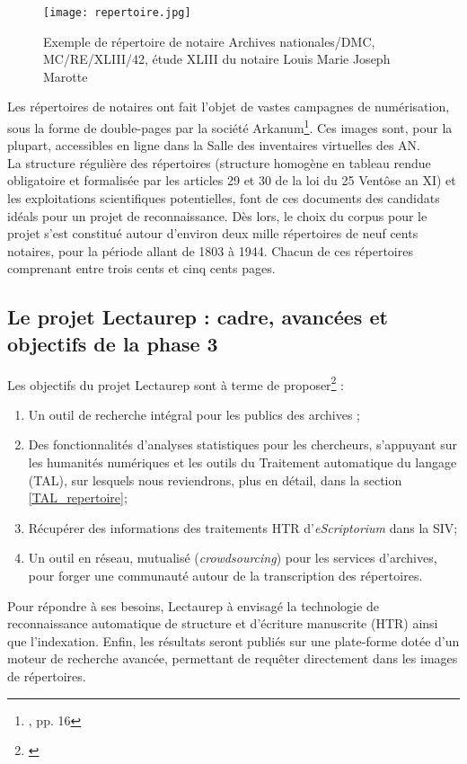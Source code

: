 \newpage
\begin{figure}[h!]
    \centering
    \texttt{[image: repertoire.jpg]}
    \caption{Exemple de répertoire de notaire  \textcopyright Archives nationales/DMC, MC/RE/XLIII/42, étude XLIII du notaire Louis Marie Joseph Marotte}
    \label{fig:repertoire}
\end{figure}
\newpage
Les répertoires de notaires ont fait l'objet de vastes campagnes de numérisation, sous la forme de double-pages par la société Arkanum\footnote{\cite{bonhomme_defis_2018}, pp. 16}. Ces images sont, pour la plupart, accessibles en ligne dans la Salle des inventaires virtuelles des AN. \\

La structure régulière des répertoires (structure homogène en tableau rendue obligatoire et formalisée par les articles 29 et 30 de la loi du 25 Ventôse an XI) et les exploitations scientifiques potentielles, font de ces documents des candidats idéals pour un projet de reconnaissance. Dès lors, le choix du corpus pour le projet s'est constitué autour d'environ deux mille répertoires de neuf cents notaires, pour la période allant de 1803 à 1944. Chacun de ces répertoires comprenant entre trois cents et cinq cents pages.

\subsection{Le projet Lectaurep : cadre, avancées et objectifs de la phase 3}

Les objectifs du projet Lectaurep sont à terme de proposer\footnote{\cite{chague_lectaurep_2019}} :
\begin{enumerate}
    \item Un outil de recherche intégral pour les publics des archives ;
    \item Des fonctionnalités d'analyses statistiques pour les chercheurs, s'appuyant sur les humanités numériques et les outils du Traitement automatique du langage (TAL), sur lesquels nous reviendrons, plus en détail, dans la section \ref{TAL_repertoire};
    \item Récupérer des informations des traitements HTR d'\textit{eScriptorium} dans la SIV;
    \item Un outil en réseau, mutualisé (\textit{crowdsourcing}) pour les services d'archives, pour forger une communauté autour de la transcription des répertoires. 
\end{enumerate}

Pour répondre à ses besoins, Lectaurep à envisagé la technologie de reconnaissance automatique de structure et d'écriture manuscrite (HTR) ainsi que l'indexation. Enfin, les résultats seront publiés sur une plate-forme dotée d'un moteur de recherche avancée, permettant de requêter directement dans les images de répertoires.\\

